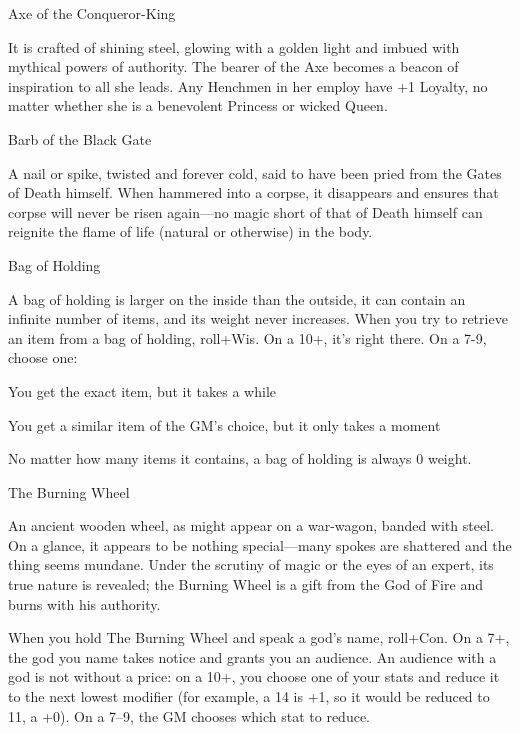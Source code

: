  

Axe of the Conqueror-King	 

 

It is crafted of shining steel, glowing with a golden light and imbued with mythical powers of authority. The bearer of the Axe becomes a beacon of inspiration to all she leads. Any Henchmen in her employ have +1 Loyalty, no matter whether she is a benevolent Princess or wicked Queen.

 

Barb of the Black Gate	 

 

A nail or spike, twisted and forever cold, said to have been pried from the Gates of Death himself. When hammered into a corpse, it disappears and ensures that corpse will never be risen again—no magic short of that of Death himself can reignite the flame of life (natural or otherwise) in the body.

 

Bag of Holding	 

 

A bag of holding is larger on the inside than the outside, it can contain an infinite number of items, and its weight never increases. When you try to retrieve an item from a bag of holding, roll+Wis. On a 10+, it's right there. On a 7-9, choose one:

 
\startitemize[1,packed]

\item You get the exact item, but it takes a while

 
\item You get a similar item of the GM's choice, but it only takes a moment


\stopitemize
 

No matter how many items it contains, a bag of holding is always 0 weight.

 

The Burning Wheel	 

 

An ancient wooden wheel, as might appear on a war-wagon, banded with steel. On a glance, it appears to be nothing special—many spokes are shattered and the thing seems mundane. Under the scrutiny of magic or the eyes of an expert, its true nature is revealed; the Burning Wheel is a gift from the God of Fire and burns with his authority.

 

When you hold The Burning Wheel and speak a god's name, roll+Con. On a 7+, the god you name takes notice and grants you an audience. An audience with a god is not without a price: on a 10+, you choose one of your stats and reduce it to the next lowest modifier (for example, a 14 is +1, so it would be reduced to 11, a +0). On a 7–9, the GM chooses which stat to reduce.

